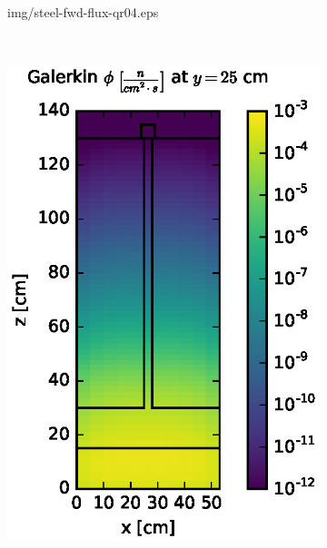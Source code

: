 \documentclass{article} %
\begin{document}
\begin{figure}[!htb]
\begin{subfigure}{0.4\textwidth}
{img/steel-fwd-flux-qr04.eps}
\end{subfigure} ~
\begin{subfigure}{0.4\textwidth}
\includegraphics[max height=0.445\textheight]
{img/steel-fwd-flux-gkn04.eps}
\end{subfigure}
\\
\begin{subfigure}{0.4\textwidth}

\end{subfigure}
\end{figure}
\end{document}
